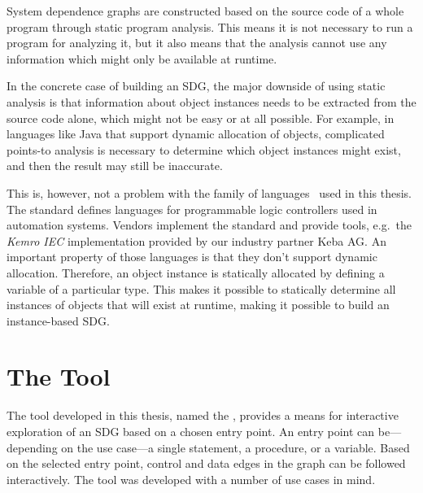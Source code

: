 System dependence graphs are constructed based on the source code of a whole program through static program analysis. 
This means it is not necessary to run a program for analyzing it, but it also means that the analysis cannot use any 
information which might only be available at runtime.

In the concrete case of building an SDG, the major downside of using static analysis is that information about object 
instances needs to be extracted from the source code alone, which might not be easy or at all possible. For example, in 
languages like Java that support dynamic allocation of objects, complicated points-to analysis is necessary to 
determine which object instances might exist, and then the result may still be inaccurate.

This is, however, not a problem with the \IEC family of languages~\cite{IEC61131:2003} used in this thesis. The \IEC 
standard defines languages for programmable logic controllers used in automation systems. Vendors implement the 
standard and provide tools, e.g.\ the \emph{Kemro IEC} implementation provided by our industry partner Keba AG. An 
important property of those languages is that they don't support dynamic allocation. Therefore, an object instance is 
statically allocated by defining a variable of a particular type. This makes it possible to statically determine all 
instances of objects that will exist at runtime, making it possible to build an instance-based SDG.


\section{The Tool} \label{sec:intro-tool}

The tool developed in this thesis, named the \emph{\SB}, provides a means for interactive exploration of an SDG based 
on a chosen entry point. An entry point can be---depending on the use case---a single statement, a procedure, or a 
variable. Based on the selected entry point, control and data edges in the graph can be followed interactively. The 
tool was developed with a number of use cases in mind.

